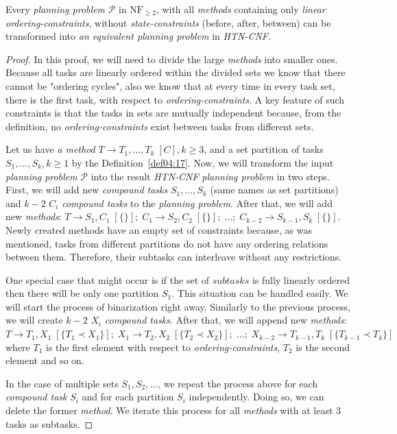 \begin{thm}\label{thm04:6}
    Every \emph{planning problem} $\mathcal{P}$ in $\text{NF}_{\geq 2}$, with all \emph{methods} containing only \emph{linear ordering-constraints}, without \emph{state-constraints} (before, after, between) can be transformed into \emph{an equivalent planning problem} in \emph{HTN-CNF}.
\end{thm}
\begin{proof}
     In this proof, we will need to divide the large \emph{methods} into smaller ones. Because all tasks are linearly ordered within the divided sets we know that there cannot be "ordering cycles", also we know that at every time in every task set, there is the first task, with respect to \emph{ordering-constraints}. A key feature of such constraints is that the tasks in sets are mutually independent because, from the definition, no \emph{ordering-constraints} exist between tasks from different sets. 

     Let us have \emph{a method} $T \rightarrow T_1, \dots, T_k \; [C], k \geq 3$, and a set partition of tasks $S_1, \dots, S_k, k \geq 1$ by the Definition~\ref{def04:17}. Now, we will transform the input \emph{planning problem} $\mathcal{P}$ into the result \emph{HTN-CNF} \emph{planning problem} in two steps. First, we will add new \emph{compound tasks} $S_1, \dots, S_k$ (same names as set partitions) and $k - 2$ $C_i$ \emph{compound tasks} to the \emph{planning problem}. After that, we will add new \emph{methods}: $T \rightarrow S_1, C_1 \; [\{\}]; \; C_1 \rightarrow S_2, C_2 \; [\{\}]; \; \dots; \; C_{k - 2} \rightarrow S_{k - 1}, S_k \; [\{\}]$. Newly created methods have an empty set of constraints because, as was mentioned, tasks from different partitions do not have any ordering relations between them. Therefore, their subtasks can interleave without any restrictions. 
     
     One special case that might occur is if the set of $subtasks$ is fully linearly ordered then there will be only one partition $S_1$. This situation can be handled easily. We will start the process of binarization right away. Similarly to the previous process, we will create $k - 2$ $X_i$ \emph{compound tasks}. After that, we will append new \emph{methods}: $T \rightarrow T_1, X_1 \; [\{T_1 \prec X_1\}]; \; X_1 \rightarrow T_2, X_2 \; [\{T_2 \prec X_2\}]; \; \dots; \; X_{k - 2} \rightarrow T_{k - 1}, T_k \; [\{T_{k - 1} \prec T_k\}]$ where $T_1$ is the first element with respect to \emph{ordering-constraints}, $T_2$ is the second element and so on.

     In the case of multiple sets $S_1, S_2, \dots$, we repeat the process above for each \emph{compound task} $S_i$ and for each partition $S_i$ independently. Doing so, we can delete the former \emph{method}. We iterate this process for all \emph{methods} with at least 3 tasks as subtasks.
\end{proof}

